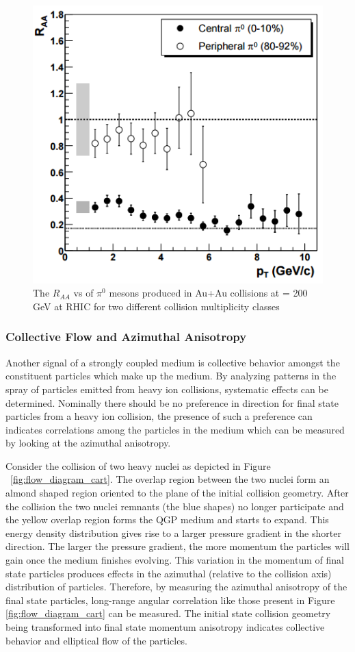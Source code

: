 \begin{figure}[!ht]
\centering
\includegraphics[width=0.6\linewidth]{figs/raa_pi0_aa_cent_periph.png}
\caption{The $R_{AA}$  vs \pt of $\pi^0$ mesons produced in Au+Au collisions at \sqsn= 200 GeV at RHIC for two different collision multiplicity classes~\cite{PhysRevLett.91.072303}}
\label{fig:RAA_plot}
\end{figure}
\clearpage

\subsubsection{Collective Flow and Azimuthal Anisotropy}
Another signal of a strongly coupled medium is collective behavior amongst the constituent particles which make up the medium. By analyzing patterns in the spray of particles emitted from heavy ion collisions, systematic effects can be determined. Nominally there should be no preference in direction for final state particles from a heavy ion collision, the presence of such a preference can indicates correlations among the particles in the medium which can be measured by looking at the azimuthal anisotropy.

Consider the collision of two heavy nuclei as depicted in Figure ~\ref{fig:flow_diagram_cart}. The overlap region between the two nuclei form an almond shaped region oriented to the plane of the initial collision geometry. After the collision the two nuclei remnants (the blue shapes) no longer participate and the yellow overlap region forms the QGP medium and starts to expand. This energy density distribution gives rise to a larger pressure gradient in the shorter direction. The larger the pressure gradient, the more momentum the particles will gain once the medium finishes evolving. This variation in the momentum of final state particles produces effects in the azimuthal (relative to the collision axis) distribution of particles. Therefore, by measuring the azimuthal anisotropy of the final state particles, long-range angular correlation like those present in Figure \ref{fig:flow_diagram_cart} can be measured. The initial state collision geometry being transformed into final state momentum anisotropy indicates collective behavior and elliptical flow of the particles.

